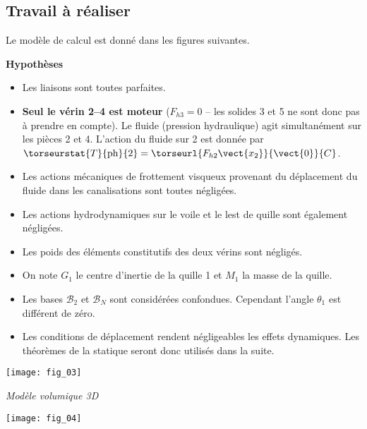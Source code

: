\begin{multicols}{2}
\subsection*{Travail à réaliser}
\ifprof
\else

Le modèle de calcul est donné dans les figures suivantes.

\textbf{Hypothèses}

\begin{itemize}
\item Les liaisons sont toutes parfaites.
\item \textbf{Seul le vérin 2--4 est moteur} ($F_{h3}=0$ -- les solides 3 et 5 ne sont donc pas à prendre en compte). Le fluide (pression hydraulique) agit simultanément sur les pièces 2 et 4. L’action du fluide sur 2 est donnée par 
$\torseurstat{T}{\text{ph}}{2}=\torseurl{F_{h2}\vect{x_2}}{\vect{0}}{C}$.
\item Les actions mécaniques de frottement visqueux provenant du déplacement du fluide dans les canalisations sont toutes négligées.%
\item Les actions hydrodynamiques sur le voile et le lest de quille sont également négligées.
\item Les poids des éléments constitutifs des deux vérins sont négligés.
\item On note $G_1$ le centre d'inertie de la quille 1 et $M_1$ la masse de la quille.
\item Les bases $\mathcal{B}_2$ et $\mathcal{B}_N$ sont considérées confondues. Cependant l’angle $\theta_1$ est différent de zéro.
\item Les conditions de déplacement rendent négligeables les effets dynamiques. Les théorèmes de la statique seront donc utilisés dans la suite.
\end{itemize}

\begin{center}
\texttt{[image: fig\_03]}

\textit{Modèle volumique 3D}
\end{center}

\begin{center}
\texttt{[image: fig\_04]}


\end{center}
\end{multicols}
